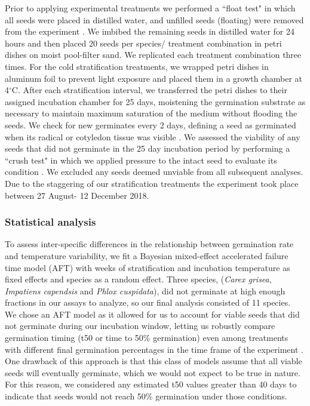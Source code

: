 \documentclass{article}[11pt]
\begin{document}
\noindent  Prior to applying experimental treatments we performed a ``float test" in which all seeds were placed in distilled water, and unfilled seeds (floating) were removed from the experiment \citep{Baskin2014}. We imbibed the remaining seeds in distilled water for 24 hours and then placed 20 seeds per species/ treatment combination in petri dishes on moist pool-filter sand. We replicated each treatment combination three times. For the cold stratification treatments, we wrapped petri dishes in aluminum foil to prevent light exposure and placed them in a growth chamber at 4$^{\circ}$C. After each stratification interval, we transferred the petri dishes to their assigned incubation chamber for 25 days, moistening the germination substrate as necessary to maintain maximum saturation of the medium without flooding the seeds. We check for new germinates every 2 days, defining a seed as germinated when its radical or cotyledon tissue was visible \citep{Baskin2014}. We assessed the viability of any seeds that did not germinate in the 25 day incubation period by performing a ``crush test" in which we applied pressure to the intact seed to evaluate its condition \citep{Baskin2014}. We excluded any seeds deemed unviable from all subsequent analyses. Due to the staggering of our stratification treatments the experiment took place between 27 August- 12 December 2018.\\

\subsubsection*{Statistical analysis}
To assess inter-specific differences in the relationship between germination rate and temperature variability, we fit a Bayesian mixed-effect accelerated failure time model (AFT) with weeks of stratification and incubation temperature as fixed effects and species as a random effect. Three species, (\textit{Carex grisea}, \textit{Impatiens capendsis} and \textit{Phlox cuspidata}), did not germinate at high enough fractions in our assays to analyze, so our final analysis consisted of 11 species.\\ 

We chose an AFT model as it allowed for us to account for viable seeds that did not germinate during our incubation window, letting us robustly compare germination timing (t50 or time to 50\% germination) even among treatments with different final germination percentages in the time frame of the experiment \citep{Soltani:2015aa}. One drawback of this approach is that this class of models assume that all viable seeds will eventually germinate, which we would not expect to be true in nature. For this reason, we considered any estimated t50 values greater than 40 days to indicate that seeds would not reach 50\% germination under those conditions. \\ 
\end{document}
